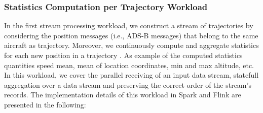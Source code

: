 \documentclass[]{article}
\begin{document}
\subsubsection{Statistics Computation per Trajectory Workload}
\label{sec:statistics}
In the first stream processing workload, we construct a stream of trajectories by considering  the position messages (i.e., ADS-B messages) that belong to the same aircraft as trajectory. Moreover, we continuously compute and aggregate statistics for each new position in a trajectory . As example of the computed statistics quantities speed mean, mean of location coordinates, min and max altitude, etc. In this workload, we cover the parallel receiving of an input data stream, statefull aggregation over a data stream and preserving the correct order of the stream's records.
The implementation details of this workload in Spark and Flink are presented in the following: 
\end{document}
